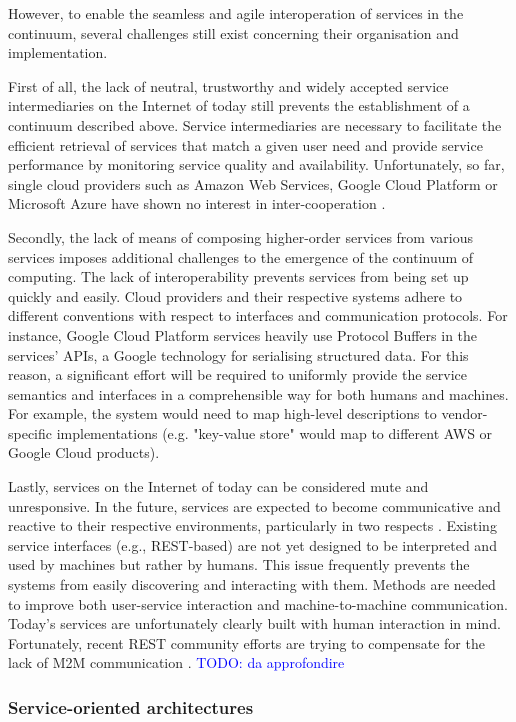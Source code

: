 However, to enable the seamless and agile interoperation of services in the continuum, several challenges still exist concerning their organisation and implementation.

First of all, the lack of neutral, trustworthy and widely accepted service intermediaries on the Internet of today still prevents the establishment of a continuum described above. Service intermediaries are necessary to facilitate the efficient retrieval of services that match a given user need and provide service performance by monitoring service quality and availability. Unfortunately, so far, single cloud providers such as Amazon Web Services, Google Cloud Platform or Microsoft Azure have shown no interest in inter-cooperation \cite{inter-cloud}.

Secondly, the lack of means of composing higher-order services from various services imposes additional challenges to the emergence of the continuum of computing. The lack of interoperability prevents services from being set up quickly and easily. Cloud providers and their respective systems adhere to different conventions with respect to interfaces and communication protocols. For instance, Google Cloud Platform services heavily use Protocol Buffers \cite{protobuf} in the services' APIs, a Google technology for serialising structured data. For this reason, a significant effort will be required to uniformly provide the service semantics and interfaces in a comprehensible way for both humans and machines. For example, the system would need to map high-level descriptions to vendor-specific implementations (e.g. "key-value store" would map to different AWS or Google Cloud products).

Lastly, services on the Internet of today can be considered mute and unresponsive. In the future, services are expected to become communicative and reactive to their respective environments, particularly in two respects \cite{iot-enterprise}. Existing service interfaces (e.g., REST-based) are not yet designed to be interpreted and used by machines but rather by humans. This issue frequently prevents the systems from easily discovering and interacting with them. Methods are needed to improve both user-service interaction and machine-to-machine communication. Today's services are unfortunately clearly built with human interaction in mind.  Fortunately, recent REST community efforts are trying to compensate for the lack of M2M communication \cite{openapi}. \textcolor{blue}{TODO: da approfondire}

\subsubsection{Service-oriented architectures}

